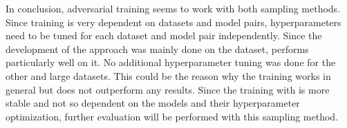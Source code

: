 In conclusion, adversarial training seems to work with both sampling methods.
Since training is very dependent on datasets and model pairs, hyperparameters need to be tuned for each dataset and model pair independently.
Since the development of the approach was mainly done on the \umls dataset, \ussoftmax performs particularly well on it.
No additional hyperparameter tuning was done for the other and large datasets.
This could be the reason why the training works in general but does not outperform any results.
Since the training with \ussoftmax is more stable and not so dependent on the models and their hyperparameter optimization, further evaluation will be performed with this sampling method.
\clearpage